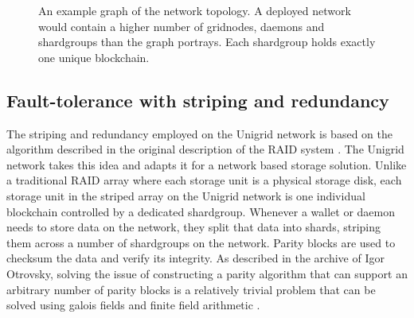 \documentclass[10pt,a4paper,final]{article}
\begin{document}
\begin{figure}[H]
\centering
{}
\caption{An example graph of the network topology. A deployed network would contain a higher number of \glspl{gridnode}, daemons and \glspl{shardgroup} than the graph portrays. Each \gls{shardgroup} holds exactly one unique blockchain.}
\end{figure}


\subsection{Fault-tolerance with striping and redundancy}
The striping and redundancy employed on the Unigrid network is based on the algorithm described in the original description of the RAID system \cite{patterson1988, chen1990}. The Unigrid network takes this idea and adapts it for a network based storage solution. Unlike a traditional RAID array where each storage unit is a physical storage disk, each storage unit in the striped array on the Unigrid network is one individual blockchain controlled by a dedicated \gls{shardgroup}. Whenever a wallet or daemon needs to store data on the network, they split that data into shards, striping them across a number of \glspl{shardgroup} on the network. Parity blocks are used to checksum the data and verify its integrity. As described in the archive of Igor Otrovsky, solving the issue of constructing a parity algorithm that can support an arbitrary number of parity blocks is a relatively trivial problem that can be solved using galois fields and finite field arithmetic \cite{igorparity2014} \cite{finitefield2021}.
\end{document}
